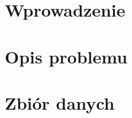\documentclass{article}
\begin{document}
\maketitle

\tableofcontents
\newpage
\section{Wprowadzenie}
\vspace*{0.5cm}
	

\newpage
\section{Opis problemu}
\vspace*{0.5cm}
	

\newpage
\section{Zbiór danych}
\vspace*{0.5cm}
	

%	
\end{document}
